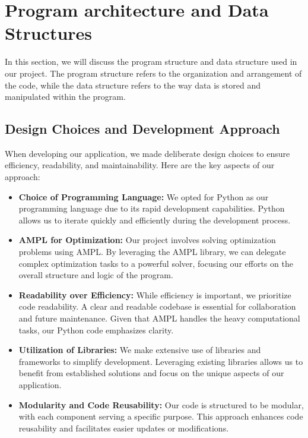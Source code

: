 \section{Program architecture and Data Structures}
\label{sec:program_structure}

In this section, we will discuss the program structure and data structure used in our project. The program structure refers to the organization and arrangement of the code, while the data structure refers to the way data is stored and manipulated within the program.

\subsection{Design Choices and Development Approach}
\label{subsec:design_choices}

When developing our application, we made deliberate design choices to ensure efficiency, readability, and maintainability. Here are the key aspects of our approach:

\begin{itemize}
    \item \textbf{Choice of Programming Language:} We opted for Python as our programming language due to its rapid development capabilities. Python allows us to iterate quickly and efficiently during the development process.
    
    \item \textbf{AMPL for Optimization:} Our project involves solving optimization problems using AMPL. By leveraging the AMPL library, we can delegate complex optimization tasks to a powerful solver, focusing our efforts on the overall structure and logic of the program.

    \item \textbf{Readability over Efficiency:} While efficiency is important, we prioritize code readability. A clear and readable codebase is essential for collaboration and future maintenance. Given that AMPL handles the heavy computational tasks, our Python code emphasizes clarity.

    \item \textbf{Utilization of Libraries:} We make extensive use of libraries and frameworks to simplify development. Leveraging existing libraries allows us to benefit from established solutions and focus on the unique aspects of our application.

    \item \textbf{Modularity and Code Reusability:} Our code is structured to be modular, with each component serving a specific purpose. This approach enhances code reusability and facilitates easier updates or modifications.
\end{itemize}

